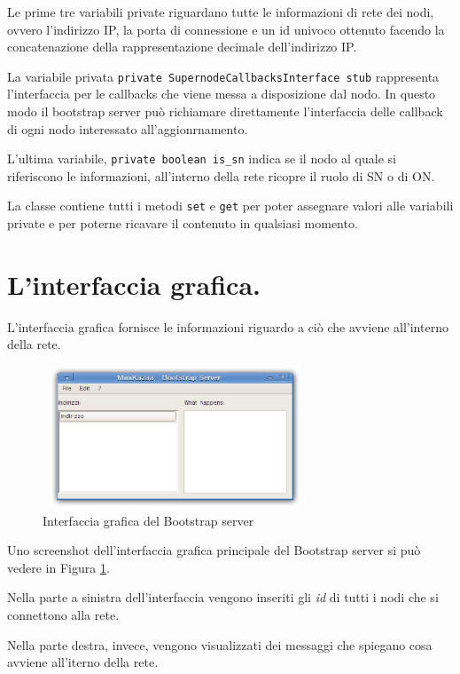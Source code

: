 Le prime tre variabili private riguardano tutte le informazioni di rete dei nodi, ovvero l'indirizzo IP,
la porta di connessione e un id univoco ottenuto facendo la concatenazione della rappresentazione decimale
dell'indirizzo IP.

La variabile privata \verb|private SupernodeCallbacksInterface stub| rappresenta l'interfaccia per le callbacks che viene messa a disposizione dal nodo. In questo modo il bootstrap server può richiamare direttamente l'interfaccia delle callback di ogni nodo interessato all'aggionrnamento.

L'ultima variabile, \verb|private boolean is_sn| indica se il nodo al quale si riferiscono le informazioni, all'interno della rete ricopre il ruolo di SN o di ON.

La classe contiene tutti i metodi \verb|set| e \verb|get| per poter assegnare valori alle variabili private e per poterne ricavare il contenuto in qualsiasi momento.

\section{L'interfaccia grafica.}
L'interfaccia grafica fornisce le informazioni riguardo a ciò che avviene all'interno della rete.

\begin{figure}[t]
 \centering
 \includegraphics[width=300px,height=160px]{images/bss_grafica.eps}
 \caption{Interfaccia grafica del Bootstrap server}
 \label{fig:bss_grafica}
\end{figure}

Uno screenshot dell'interfaccia grafica principale del Bootstrap server si può vedere in Figura \ref{fig:bss_grafica}.

Nella parte a sinistra dell'interfaccia vengono inseriti gli \emph{id} di tutti i nodi che si connettono alla rete.

Nella parte destra, invece, vengono visualizzati dei messaggi che spiegano cosa avviene all'iterno della rete.



